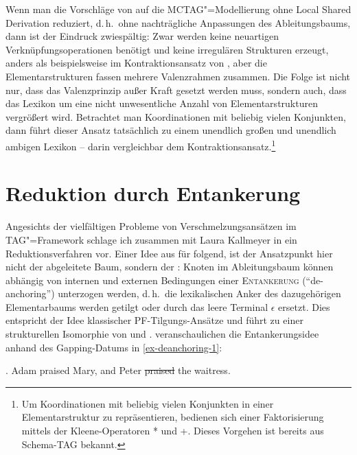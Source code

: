 Wenn man die Vorschläge von \cite{Seddah:etal:10} auf die MCTAG"=Modellierung ohne Local Shared Derivation reduziert, d.\,h.\ ohne nachträgliche Anpassungen des Ableitungsbaums, dann ist der Eindruck zwiespältig: Zwar werden keine neuartigen Verknüpfungsoperationen benötigt und keine irregulären Strukturen erzeugt, anders als beispielsweise im Kontraktionsansatz von \cite{Sarkar:Joshi:97}, aber die Elementarstrukturen fassen mehrere Valenzrahmen zusammen. Die Folge  ist nicht nur, dass das Valenzprinzip au\ss er Kraft gesetzt werden muss, sondern auch, dass das Lexikon um eine nicht unwesentliche Anzahl von Elementarstrukturen vergrö\ss ert wird. Betrachtet man Koordinationen mit beliebig vielen Konjunkten, dann führt dieser Ansatz tatsächlich zu einem unendlich gro\ss en und unendlich ambigen Lexikon -- darin vergleichbar dem Kontraktionsansatz.\footnote{Um Koordinationen mit beliebig vielen Konjunkten in einer Elementarstruktur zu repräsentieren, bedienen sich \cite{Seddah:etal:10} einer Faktorisierung mittels der Kleene-Operatoren * und +. Dieses Vorgehen ist bereits aus Schema-TAG \citep{Harbusch:00b} bekannt.}    



\section{Reduktion durch Entankerung} \label{sec-deanchoring}

Angesichts der vielfältigen Probleme von Verschmelzungsansätzen im TAG"=Framework schlage ich zusammen mit Laura Kallmeyer in \cite{Lichte:Kallmeyer:10} ein Reduktionsverfahren vor. Einer Idee aus \cite{Kobele:09} für  folgend, ist der Ansatzpunkt hier nicht der abgeleitete Baum, sondern der : Knoten im Ableitungsbaum können abhängig von internen und externen Bedingungen einer \textsc{Entankerung} ("`de-anchoring"') unterzogen werden, d.\,h.\ die lexikalischen Anker des dazugehörigen Elementarbaums werden getilgt oder durch das leere Terminal $\epsilon$ ersetzt. Dies entspricht der Idee klassischer PF-Tilgungs-Ansätze und führt zu einer strukturellen Isomorphie von  und .  \cite{Lichte:Kallmeyer:10} veranschaulichen die Ent\-anker\-ungs\-idee anhand des Gapping-Datums in \ref{ex-deanchoring-1}: 

\ex. \label{ex-deanchoring-1} Adam praised Mary, and Peter \sout{praised} the waitress.   
  
